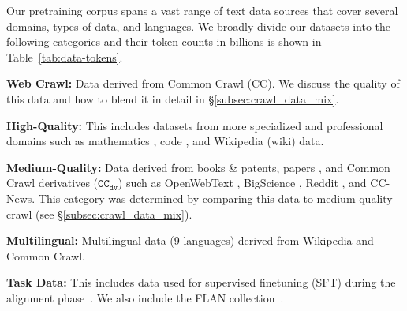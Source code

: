 \documentclass[11pt]{article}
\newenvironment{tight_itemize}{
\begin{itemize}
  \setlength{\itemsep}{0pt}
  \setlength{\parskip}{0pt}
}{\end{itemize}}
\newcommand{\todo}[1]{{\color{red}\bf [TODO: #1]}\xspace}
\newcommand{\citereq}[1]{{\color{blue}\bf [CITE]}\xspace}
\newcommand{\ccderiv}{$\mathtt{CC_{dv}}$\xspace}
\begin{document}
Our pretraining corpus spans a vast range of text data sources that cover several domains, types of data, and languages. 
We broadly divide our datasets into the following categories and their token counts in billions is shown in Table~\ref{tab:data-tokens}.

\begin{tight_itemize}
    \item \textbf{Web Crawl:} Data derived from Common Crawl (CC). We discuss the quality of this data and how to blend it in detail in \S\ref{subsec:crawl_data_mix}.
    \item \textbf{High-Quality:} This includes datasets from more specialized and professional domains such as mathematics \cite{paster2024openwebmath,stackexchange}, code \cite{li2023starcoder}, and Wikipedia (wiki) %
    data. 
    \item \textbf{Medium-Quality:} Data derived from books \& patents,  %
    papers \cite{gao2020pile800gbdatasetdiverse}, and Common Crawl derivatives (\ccderiv) such as OpenWebText \cite{Gokaslan2019OpenWeb}, BigScience \cite{bigscience}, Reddit \cite{baumgartner2020pushshiftredditdataset}, and CC-News. This category was determined by comparing this data to medium-quality crawl (see \S\ref{subsec:crawl_data_mix}). %
    \item \textbf{Multilingual:} Multilingual data (9 languages) derived from Wikipedia and Common Crawl.
    \item \textbf{Task Data:} This includes data used for supervised finetuning (SFT) during the alignment phase~\cite{toshniwal2024openmathinstruct,nvidia2024nemotron4340btechnicalreport}. We also include the FLAN collection~\cite{longpre2023flan}.
\end{tight_itemize}
\end{document}
